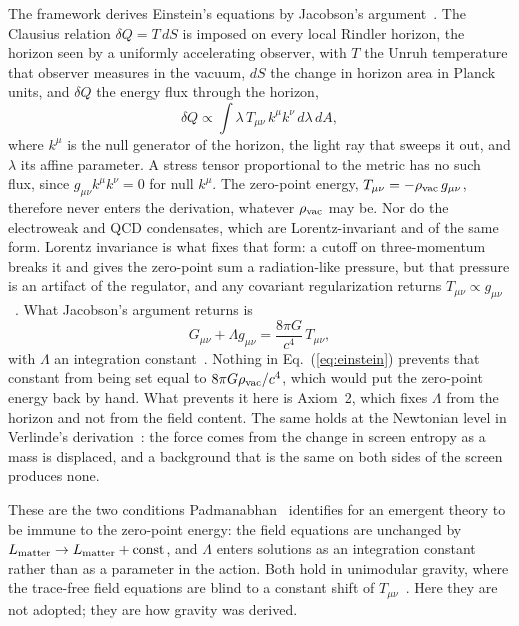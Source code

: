 \documentclass[aps,prd,twocolumn,superscriptaddress,nofootinbib,showkeys]{revtex4-2}
\begin{document}
The framework derives Einstein's equations by Jacobson's argument~\cite{jacobson1995}. The Clausius relation $\delta Q = T\,dS$ is imposed on every local Rindler horizon, the horizon seen by a uniformly accelerating observer, with $T$ the Unruh temperature that observer measures in the vacuum, $dS$ the change in horizon area in Planck units, and $\delta Q$ the energy flux through the horizon,
\begin{equation}
\delta Q \propto \int \lambda\, T_{\mu\nu}\,k^\mu k^\nu\, d\lambda\, dA,
\label{eq:flux}
\end{equation}
where $k^\mu$ is the null generator of the horizon, the light ray that sweeps it out, and $\lambda$ its affine parameter. A stress tensor proportional to the metric has no such flux, since $g_{\mu\nu}k^\mu k^\nu = 0$ for null $k^\mu$. The zero-point energy, $T_{\mu\nu} = -\rho_{\rm vac}\,g_{\mu\nu}$, therefore never enters the derivation, whatever $\rho_{\rm vac}$ may be. Nor do the electroweak and QCD condensates, which are Lorentz-invariant and of the same form. Lorentz invariance is what fixes that form: a cutoff on three-momentum breaks it and gives the zero-point sum a radiation-like pressure, but that pressure is an artifact of the regulator, and any covariant regularization returns $T_{\mu\nu}\propto g_{\mu\nu}$~\cite{martin2012}. What Jacobson's argument returns is
\begin{equation}
G_{\mu\nu} + \Lambda g_{\mu\nu} = \frac{8\pi G}{c^4}\,T_{\mu\nu},
\label{eq:einstein}
\end{equation}
with $\Lambda$ an integration constant~\cite{jacobson1995,banks2018}. Nothing in Eq.~(\ref{eq:einstein}) prevents that constant from being set equal to $8\pi G\rho_{\rm vac}/c^4$, which would put the zero-point energy back by hand. What prevents it here is Axiom~2, which fixes $\Lambda$ from the horizon and not from the field content. The same holds at the Newtonian level in Verlinde's derivation~\cite{verlinde2011}: the force comes from the change in screen entropy as a mass is displaced, and a background that is the same on both sides of the screen produces none.

These are the two conditions Padmanabhan~\cite{padmanabhan2014} identifies for an emergent theory to be immune to the zero-point energy: the field equations are unchanged by $L_{\rm matter}\to L_{\rm matter}+{\rm const}$, and $\Lambda$ enters solutions as an integration constant rather than as a parameter in the action. Both hold in unimodular gravity, where the trace-free field equations are blind to a constant shift of $T_{\mu\nu}$~\cite{ellis2011,bonder2018}. Here they are not adopted; they are how gravity was derived.
\end{document}
